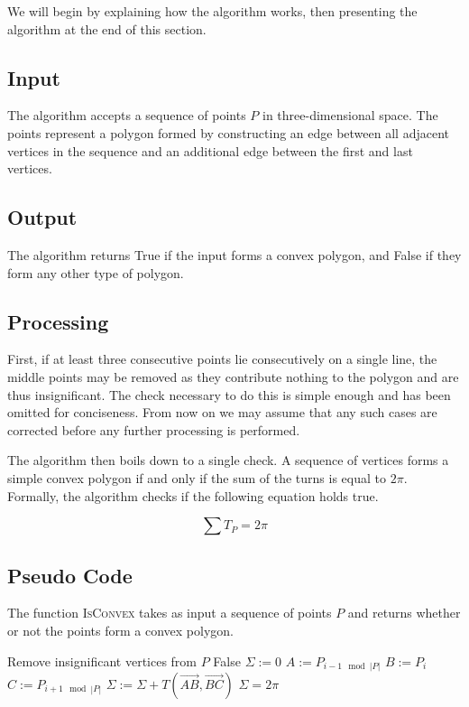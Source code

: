 \documentclass{article}
\newcommand{\vecl}{\overrightarrow} %
\begin{document}
We will begin by explaining how the algorithm works, then presenting the algorithm at the end of this section.

\subsection{Input}

The algorithm accepts a sequence of points \(P\) in three-dimensional space. The points represent a polygon formed by constructing an edge between all adjacent vertices in the sequence and an additional edge between the first and last vertices.

\subsection{Output}

The algorithm returns True if the input forms a convex polygon, and False if they form any other type of polygon.

\subsection{Processing} \label{processing}

First, if at least three consecutive points lie consecutively on a single line, the middle points may be removed as they contribute nothing to the polygon and are thus insignificant. The check necessary to do this is simple enough and has been omitted for conciseness. From now on we may assume that any such cases are corrected before any further processing is performed.

The algorithm then boils down to a single check. A sequence of vertices forms a simple convex polygon if and only if the sum of the turns is equal to \(2\pi\). Formally, the algorithm checks if the following equation holds true.

\begin{equation*}
	\sum T_P = 2\pi
\end{equation*}

\subsection{Pseudo Code}

The function \textsc{IsConvex} takes as input a sequence of points \(P\) and returns whether or not the points form a convex polygon.

\begin{algorithm}[htbp]
	\begin{algorithmic}
		\State Remove insignificant vertices from \(P\)
		\Return False
		\EndIf
		\State \(\Sigma := 0\) 
		\State \(A := P_{i-1 \mod |P|}\) 
		\State \(B := P_{i}\) 
		\State \(C := P_{i+1 \mod |P|}\) 
		\State \(\Sigma := \Sigma + T(\vecl{AB}, \vecl{BC})\) 
		\EndFor
		\State\Return \(\Sigma = 2\pi\)
		\EndFunction
	\end{algorithmic}
\end{algorithm}
\end{document}
